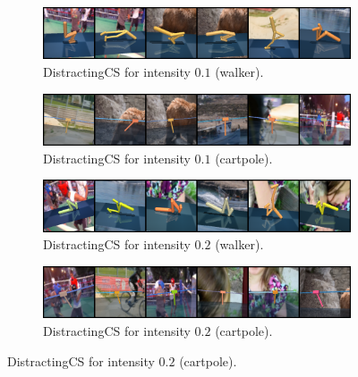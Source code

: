 \begin{figure}
    \begin{subfigure}[b]{0.48\textwidth}
        \centering
        \includegraphics[width=\textwidth]{figures/visualizations/obs_env_dcs_easy.png}
        \caption{DistractingCS for intensity $0.1$ (walker).}
        \vspace{0.1in}
    \end{subfigure}
    \begin{subfigure}[b]{0.48\textwidth}
        \centering
        \includegraphics[width=\textwidth]{figures/visualizations/obs_cartpole_env_dcs_easy.png}
        \caption{DistractingCS for intensity $0.1$ (cartpole).}
        \vspace{0.1in}
    \end{subfigure}
    \begin{subfigure}[b]{0.48\textwidth}
        \centering
        \includegraphics[width=\textwidth]{figures/visualizations/obs_env_dcs_medium.png}
        \caption{DistractingCS for intensity $0.2$ (walker).}
        \vspace{0.1in}
    \end{subfigure}
    \begin{subfigure}[b]{0.48\textwidth}
        \centering
        \includegraphics[width=\textwidth]{figures/visualizations/obs_cartpole_env_dcs_medium.png}
        \caption{DistractingCS for intensity $0.2$ (cartpole).}
        \vspace{0.1in}
    \end{subfigure}

\end{figure}
